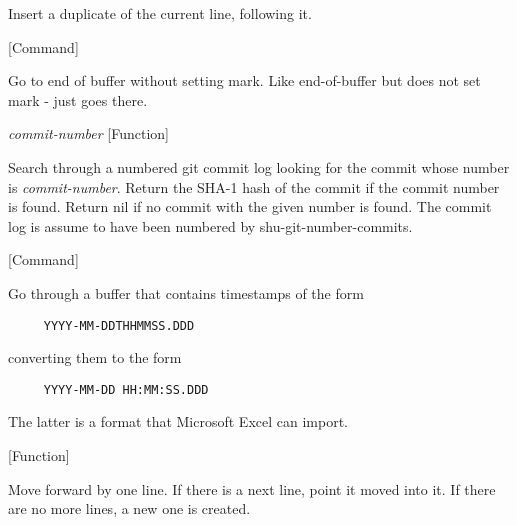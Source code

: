\begin{doc-string}
Insert a duplicate of the current line, following it.
\end{doc-string}

\vspace{1em}
\noindent
{}
\usebox{\funcname}
 \hfill [Command]

\begin{doc-string}
Go to end of buffer without setting mark.  Like end-of-buffer
but does not set mark - just goes there.
\end{doc-string}

\vspace{1em}
\noindent
{}
\usebox{\funcname}\emph{commit-number}
 \hfill [Function]

\begin{doc-string}
Search through a numbered git commit log looking for the commit whose number is
\emph{commit-number}.  Return the SHA-1 hash of the commit if the commit number is found.
Return nil if no commit with the given number is found.
The commit log is assume to have been numbered by shu-git-number-commits.
\end{doc-string}

\vspace{1em}
\noindent
{}
\usebox{\funcname}
 \hfill [Command]

\begin{doc-string}
Go through a buffer that contains timestamps of the form
\begin{verbatim}
     YYYY-MM-DDTHHMMSS.DDD
\end{verbatim}
converting them to the form
\begin{verbatim}
     YYYY-MM-DD HH:MM:SS.DDD
\end{verbatim}
The latter is a format that Microsoft Excel can import.
\end{doc-string}

\vspace{1em}
\noindent
{}
\usebox{\funcname}
 \hfill [Function]

\begin{doc-string}
Move forward by one line.  If there is a next line, point it moved into
it.  If there are no more lines, a new one is created.
\end{doc-string}

